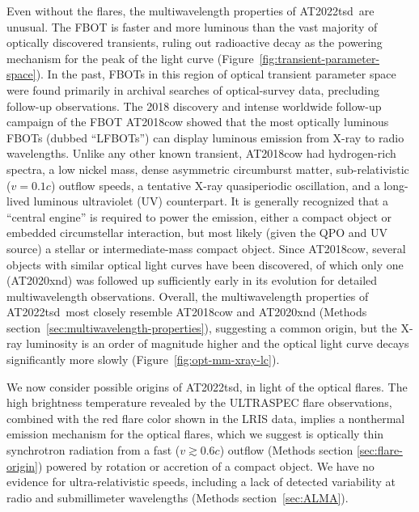 \documentclass{nature_plusfigure}
\newcommand{\at}{AT2022tsd}
\begin{document}
Even without the flares, the multiwavelength properties of \at\ are unusual. The FBOT is faster and more luminous than the vast majority of optically discovered transients, ruling out radioactive decay as the powering mechanism for the peak of the light curve (Figure~\ref{fig:transient-parameter-space}). In the past, FBOTs in this region of optical transient parameter space were found primarily in archival searches of optical-survey data\cite{Drout2014,Arcavi2016,Pursiainen2018,Ho2022_RET}, precluding follow-up observations. The 2018 discovery\cite{Prentice2018} and intense worldwide follow-up campaign of the FBOT AT2018cow showed that the most optically luminous FBOTs (dubbed ``LFBOTs'')\cite{Metzger2022} can display luminous emission from X-ray to radio wavelengths\cite{RiveraSandoval2018,Margutti2019,Ho2019}. Unlike any other known transient, AT2018cow had hydrogen-rich spectra\cite{Perley2019}, a low nickel mass\cite{Perley2019}, dense\cite{Ho2019} asymmetric\cite{Margutti2019,Maund2023} circumburst matter, sub-relativistic ($v=0.1c$)\cite{Ho2019} outflow speeds, a tentative X-ray quasiperiodic oscillation\cite{Pasham2021,Zhang2022}, and a long-lived luminous ultraviolet (UV) counterpart\cite{Sun2023}. It is generally recognized that a ``central engine'' is required to power the emission, either a compact object\cite{Prentice2018,Perley2019,Margutti2019,Ho2019} or embedded circumstellar interaction\cite{Margutti2019}, but most likely (given the QPO and UV source) a stellar\cite{Margutti2019,Pasham2021} or intermediate-mass\cite{Kuin2019,Perley2019,Zhang2022,Chen2023} compact object. 
Since AT2018cow, several objects with similar optical light curves have been discovered\cite{Coppejans2020,Ho2020_Koala,Perley2021,Yao2022}, of which only one (AT2020xnd\cite{Perley2021}) was followed up sufficiently early in its evolution for detailed multiwavelength observations\cite{Bright2022,Ho2022_AT2020xnd}. Overall, the multiwavelength properties of \at\ most closely resemble AT2018cow and AT2020xnd (Methods section~\ref{sec:multiwavelength-properties}), suggesting a common origin, but the X-ray luminosity is an order of magnitude higher and the optical light curve decays significantly more slowly (Figure~\ref{fig:opt-mm-xray-lc}).

We now consider possible origins of \at, in light of the optical flares. The high brightness temperature revealed by the ULTRASPEC flare observations, combined with the red flare color shown in the LRIS data, implies a nonthermal emission mechanism for the optical flares, which we suggest is optically thin synchrotron radiation from a fast ($v\gtrsim0.6c$) outflow (Methods section \ref{sec:flare-origin}) powered by rotation or accretion of a compact object.
We have no evidence for ultra-relativistic speeds, including a lack of detected variability at radio and submillimeter wavelengths (Methods section~\ref{sec:ALMA}).
\end{document}
